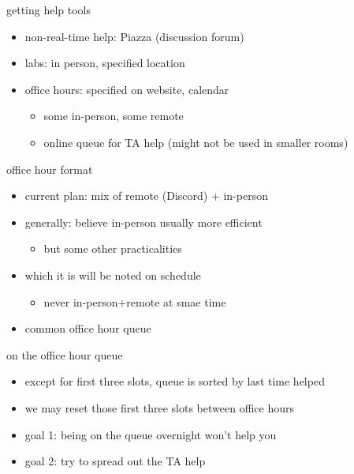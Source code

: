 \begin{frame}{getting help tools}
    \begin{itemize}
    \item non-real-time help: Piazza (discussion forum)
    \item labs: in person, specified location
    \item office hours: specified on website, calendar
        \begin{itemize}
        \item some in-person, some remote
        \item online queue for TA help (might not be used in smaller rooms)
        \end{itemize}
    \end{itemize}
\end{frame}

\begin{frame}{office hour format}
    \begin{itemize}
    \item current plan: mix of remote (Discord) + in-person
    \item generally: believe in-person usually more efficient
        \begin{itemize}
        \item but some other practicalities
        \end{itemize}
    \item which it is will be noted on schedule
        \begin{itemize}
        \item never in-person+remote at smae time
        \end{itemize}
    \item common office hour queue
    \end{itemize}
\end{frame}

\begin{frame}{on the office hour queue}
    \begin{itemize}
    \item except for first three slots, queue is sorted by last time helped
    \item we may reset those first three slots between office hours
    \vspace{.5cm}
    \item goal 1: being on the queue overnight won't help you
    \item goal 2: try to spread out the TA help
    \end{itemize}
\end{frame}

